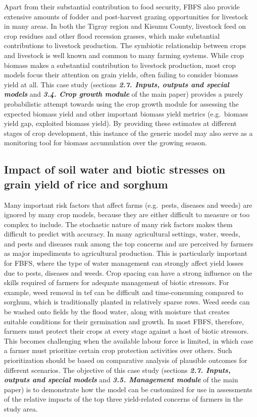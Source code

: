 \documentclass[]{elsarticle} %
\begin{document}
Apart from their substantial contribution to food security, FBFS also provide extensive amounts of fodder and post-harvest grazing opportunities for livestock in many areas. In both the Tigray region and Kisumu County, livestock feed on crop residues and other flood recession grasses, which make substantial contributions to livestock production. The symbiotic relationship between crops and livestock is well known and common to many farming systems. While crop biomass makes a substantial contribution to livestock production, most crop models focus their attention on grain yields, often failing to consider biomass yield at all. This case study (sections \textbf{\emph{2.7. Inputs, outputs and special models}} and \textbf{\emph{3.4. Crop growth module}} of the main paper) provides a purely probabilistic attempt towards using the crop growth module for assessing the expected biomass yield and other important biomass yield metrics (e.g.~biomass yield gap, exploited biomass yield). By providing these estimates at different stages of crop development, this instance of the generic model may also serve as a monitoring tool for biomass accumulation over the growing season.

\hypertarget{refs53}{%
\subsection{Impact of soil water and biotic stresses on grain yield of rice and sorghum}\label{refs53}}

Many important risk factors that affect farms (e.g.~pests, diseases and weeds) are ignored by many crop models, because they are either difficult to measure or too complex to include. The stochastic nature of many risk factors makes them difficult to predict with accuracy. In many agricultural settings, water, weeds, and pests and diseases rank among the top concerns and are perceived by farmers as major impediments to agricultural production. This is particularly important for FBFS, where the type of water management can strongly affect yield losses due to pests, diseases and weeds. Crop spacing can have a strong influence on the skills required of farmers for adequate management of biotic stressors. For example, weed removal in tef can be difficult and time-consuming compared to sorghum, which is traditionally planted in relatively sparse rows. Weed seeds can be washed onto fields by the flood water, along with moisture that creates suitable conditions for their germination and growth. In most FBFS, therefore, farmers must protect their crops at every stage against a host of biotic stressors. This becomes challenging when the available labour force is limited, in which case a farmer must prioritize certain crop protection activities over others. Such prioritization should be based on comparative analysis of plausible outcomes for different scenarios. The objective of this case study (sections \textbf{\emph{2.7. Inputs, outputs and special models}} and \textbf{\emph{3.5. Management module}} of the main paper) is to demonstrate how the model can be customized for use in assessments of the relative impacts of the top three yield-related concerns of farmers in the study area.
\end{document}
